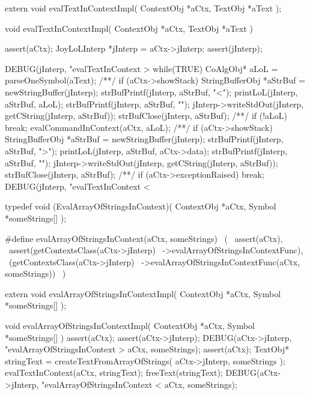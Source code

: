 \startCHeader
extern void evalTextInContextImpl(
  ContextObj *aCtx,
  TextObj    *aText
);
\stopCHeader
{}

\startCCode
void evalTextInContextImpl(
  ContextObj *aCtx,
  TextObj    *aText
) {
  assert(aCtx);
  JoyLoLInterp *jInterp = aCtx->jInterp;
  assert(jInterp);

  DEBUG(jInterp, "evalTextInContext > %
  while(TRUE) {
    CoAlgObj* aLoL = parseOneSymbol(aText);
/**/    if (aCtx->showStack) {
      StringBufferObj *aStrBuf =
        newStringBuffer(jInterp);
      strBufPrintf(jInterp, aStrBuf, "<");
      printLoL(jInterp, aStrBuf, aLoL);
      strBufPrintf(jInterp, aStrBuf, "\n");
      jInterp->writeStdOut(jInterp, getCString(jInterp, aStrBuf));
      strBufClose(jInterp, aStrBuf);
    } /**/
    if (!aLoL) break;
    evalCommandInContext(aCtx, aLoL);
/**/    if (aCtx->showStack) {
      StringBufferObj *aStrBuf =
        newStringBuffer(jInterp);
      strBufPrintf(jInterp, aStrBuf, ">");
      printLoL(jInterp, aStrBuf, aCtx->data);
      strBufPrintf(jInterp, aStrBuf, "\n");
      jInterp->writeStdOut(jInterp, getCString(jInterp, aStrBuf));
      strBufClose(jInterp, aStrBuf);
    } /**/
    if (aCtx->exceptionRaised) break;
  }
  DEBUG(jInterp, "evalTextInContext < %
}
\stopCCode

\startCHeader
typedef void (EvalArrayOfStringsInContext)(
  ContextObj *aCtx,
  Symbol     *someStrings[]
);

#define evalArrayOfStringsInContext(aCtx, someStrings)      \
  (                                                         \
    assert(aCtx),                                           \
    assert(getContextsClass(aCtx->jInterp)                  \
      ->evalArrayOfStringsInContextFunc),                   \
    (getContextsClass(aCtx->jInterp)                        \
      ->evalArrayOfStringsInContextFunc(aCtx, someStrings)) \
  )
\stopCHeader

\setCHeaderStream{private}
\startCHeader
extern void evalArrayOfStringsInContextImpl(
  ContextObj *aCtx,
  Symbol     *someStrings[]
);
\stopCHeader
\setCHeaderStream{public}

\startCCode
void evalArrayOfStringsInContextImpl(
  ContextObj *aCtx,
  Symbol     *someStrings[]
) {
  assert(aCtx);
  assert(aCtx->jInterp);
  DEBUG(aCtx->jInterp, "evalArrayOfStringsInContext > %
    aCtx, someStrings);
  assert(aCtx);
  TextObj* stringText =
    createTextFromArrayOfStrings(
      aCtx->jInterp,
      someStrings
    );
  evalTextInContext(aCtx, stringText);
  freeText(stringText);
  DEBUG(aCtx->jInterp, "evalArrayOfStringsInContext < %
    aCtx, someStrings);
}
\stopCCode


